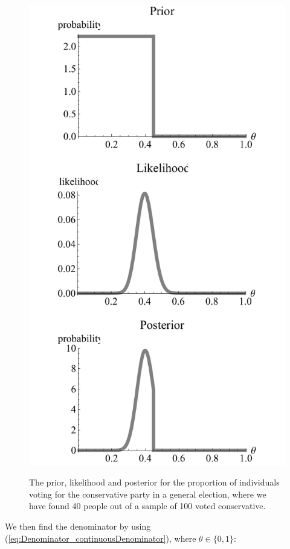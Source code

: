 \documentclass[11pt,fullpage]{book}
\begin{document}
\begin{figure}
\centering
\scalebox{0.8} 
{\includegraphics{Denominator_continuousExample.pdf}}\caption{The prior, likelihood and posterior for the proportion of individuals voting for the conservative party in a general election, where we have found 40 people out of a sample of 100 voted conservative.}\label{fig:Denominator_continuousExample}
\end{figure}

We then find the denominator by using (\ref{eq:Denominator_continuousDenominator}), where $\theta\in\{0,1\}$:
\end{document}
